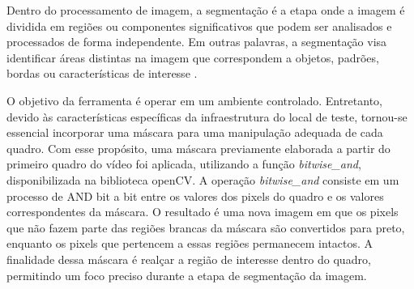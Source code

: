 Dentro do processamento de imagem, a segmentação é a etapa onde a imagem é dividida em regiões ou componentes significativos que podem ser analisados e processados de forma independente. Em outras palavras, a segmentação visa identificar áreas distintas na imagem que correspondem a objetos, padrões, bordas ou características de interesse \cite{imagemMonocromatica}.

O objetivo da ferramenta é operar em um ambiente controlado. Entretanto, devido às características específicas da infraestrutura do local de teste, tornou-se essencial incorporar uma máscara para uma manipulação adequada de cada quadro. Com esse propósito, uma máscara previamente elaborada a partir do primeiro quadro do vídeo foi aplicada, utilizando a função \textit{bitwise\_and}, disponibilizada na biblioteca \ac{openCV}. A operação \textit{bitwise\_and} consiste em um processo de AND bit a bit entre os valores dos pixels do quadro e os valores correspondentes da máscara. O resultado é uma nova imagem em que os pixels que não fazem parte das regiões brancas da máscara são convertidos para preto, enquanto os pixels que pertencem a essas regiões permanecem intactos. A finalidade dessa máscara é realçar a região de interesse dentro do quadro, permitindo um foco preciso durante a etapa de segmentação da imagem.

